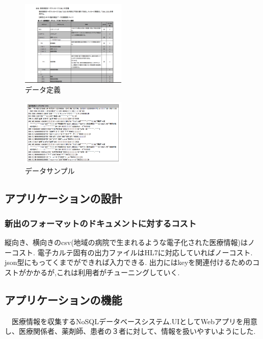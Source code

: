 	\begin{figure}[htbp]
		\begin{center}
			\includegraphics[width=5cm, bb=0 0 645 790]{ss-mix_sample.png} %
		\end{center}
		\caption{データ定義}
		\label{ss-mix_sample}
	\end{figure}

	\begin{figure}[htbp]
		\begin{center}
			\includegraphics[width=5cm, bb=0 0 437 688]{ss-mix_sampledata.png}
		\end{center}
		\caption{データサンプル}
		\label{ss-mix_sampledata}
	\end{figure}

\subsection{アプリケーションの設計}

	\subsubsection{新出のフォーマットのドキュメントに対するコスト}
	縦向き、横向きのcsv(地域の病院で生まれるような電子化された医療情報)はノーコスト.
	電子カルテ固有の出力ファイルはHL7に対応していればノーコスト.
	json型にもってくまでができれば入力できる.
	出力にはkeyを関連付けるためのコストがかかるが,これは利用者がチューニングしていく.


\subsection{アプリケーションの機能}
　医療情報を収集するNoSQLデータベースシステム.UIとしてWebアプリを用意し、医療関係者、薬剤師、患者の３者に対して、情報を扱いやすいようにした.


